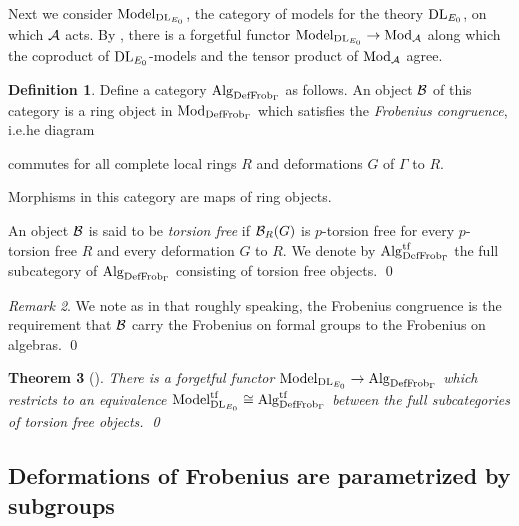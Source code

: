 \documentclass{gtpart}
\newtheorem{thm}{Theorem}
\theoremstyle{definition}
\newtheorem{defn}[thm]{Definition}
\theoremstyle{remark}
\newtheorem{rmk}[thm]{Remark}
\newcommand{\DL}{{\rm DL}}
\newcommand{\CA}{{\cal A}}
\newcommand{\Mod}{{\rm Mod}}
\newcommand{\Alg}{{\rm Alg}}
\newcommand{\Frob}{{\rm Frob}}
\newcommand{\DF}{{{\rm DefFrob}_\Gamma}}
\newcommand{\Model}{{\rm Model}}
\begin{document}
Next we consider $\Model_{\DL_{E_0}}$, the category of models for the theory 
$\DL_{E_0}$, on which $\CA$ acts.  By \cite[proposition 7.6]{lpo}, there is a 
forgetful functor $\Model_{\DL_{E_0}} \to \Mod_\CA$ along which the coproduct 
of $\DL_{E_0}$-models and the tensor product of $\Mod_\CA$ agree.  
\begin{defn}
\label{def:alg}
 Define a category $\Alg_\DF$ as follows.  An object $\cal B$ of this category 
 is a ring object in $\Mod_\DF$ which satisfies the {\em Frobenius 
 congruence}, i.e.he diagram 
 \begin{center}
 \end{center}
 commutes for all complete local rings $R$ and deformations $G$ of $\Gamma$ to 
 $R$.  

 Morphisms in this category are maps of ring objects.  

 An object ${\cal B}$ is said to be {\em torsion free} if  ${\cal B}_R(G)$ is 
 $p$-torsion free for every $p$-torsion free $R$ and every deformation $G$ to 
 $R$.  We denote by $\Alg_\DF^{\rm tf}$ the full subcategory of $\Alg_\DF$ 
 consisting of torsion free objects.  \qed
\end{defn}
\begin{rmk}
 We note as in \cite[11.18]{cong} that roughly speaking, the Frobenius 
 congruence is the requirement that $\cal B$ carry the Frobenius on formal 
 groups to the Frobenius on algebras.  \qed
\end{rmk}

\begin{thm}[{\cite[pre-theorem 16.5]{lpo}}]
 There is a forgetful functor $\Model_{\DL_{E_0}} \to \Alg_\DF$ which 
 restricts to an equivalence $\Model_{\DL_{E_0}}^{\rm tf} \cong 
 \Alg_\DF^{\rm tf}$ between the full subcategories of torsion free objects.  
 \qed
\end{thm}


\subsection{Deformations of Frobenius are parametrized by subgroups}
\label{subsec:subgp}
\end{document}
